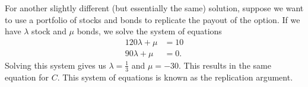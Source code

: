 For another slightly different (but essentially the same) solution, suppose we want to use a portfolio of stocks and bonds to replicate the payout of the option. If we have $\lambda$ stock and $\mu$ bonds, we solve the system of equations \begin{align*}
	120\lambda + \mu &= 10 \\
	90\lambda + \mu &= 0.
\end{align*} Solving this system gives us $\lambda=\frac{1}{3}$ and $\mu=-30$. This results in the same equation for $C$. This system of equations is known as the replication argument.
